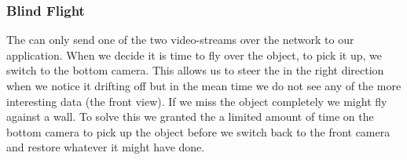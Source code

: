\subsubsection{Blind Flight}
The \Ardrone can only send one of the two video-streams over the network to our application. 
When we decide it is time to fly over the object, to pick it up, we switch to the bottom 
camera. This allows us to steer the \Ardrone in the right direction when we notice it drifting
off but in the mean time we do not see any of the more interesting data (the front view). If
we miss the object completely we might fly against a wall. To solve this we granted the
\Ardrone a limited amount of time on the bottom camera to pick up the object before we switch
back to the front camera and restore whatever it might have done. 

\label{sec:pickingUp}

























